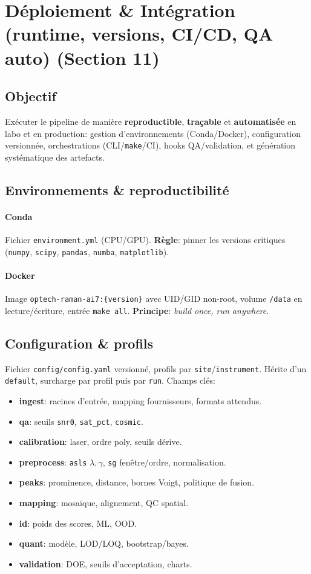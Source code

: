 
\section{Déploiement \& Intégration (runtime, versions, CI/CD, QA auto) (Section 11)}

\subsection{Objectif}
Exécuter le pipeline de manière \textbf{reproductible}, \textbf{traçable} et \textbf{automatisée} en labo et en production: gestion d'environnements (Conda/Docker), configuration versionnée, orchestrations (CLI/\texttt{make}/CI), hooks QA/validation, et génération systématique des artefacts.

\subsection{Environnements \& reproductibilité}
\paragraph{Conda} Fichier \texttt{environment.yml} (CPU/GPU). \textbf{Règle}: pinner les versions critiques (\texttt{numpy}, \texttt{scipy}, \texttt{pandas}, \texttt{numba}, \texttt{matplotlib}).
\paragraph{Docker} Image \texttt{optech-raman-ai7:\{version\}} avec UID/GID non-root, volume \texttt{/data} en lecture/écriture, entrée \texttt{make all}. \textbf{Principe}: \emph{build once, run anywhere}.

\subsection{Configuration \& profils}
Fichier \texttt{config/config.yaml} versionné, profils par \texttt{site}/\texttt{instrument}. Hérite d'un \texttt{default}, surcharge par profil puis par \texttt{run}. Champs clés:
\begin{itemize}[nosep]
\item \textbf{ingest}: racines d'entrée, mapping fournisseurs, formats attendus.
\item \textbf{qa}: seuils \texttt{snr0}, \texttt{sat\_pct}, \texttt{cosmic}.
\item \textbf{calibration}: laser, ordre poly, seuils dérive.
\item \textbf{preprocess}: \texttt{asls} $\lambda,\gamma$, \texttt{sg} fen\^etre/ordre, normalisation.
\item \textbf{peaks}: prominence, distance, bornes Voigt, politique de fusion.
\item \textbf{mapping}: mosaïque, alignement, QC spatial.
\item \textbf{id}: poids des scores, ML, OOD.
\item \textbf{quant}: modèle, LOD/LOQ, bootstrap/bayes.
\item \textbf{validation}: DOE, seuils d'acceptation, charts.
\end{itemize}

